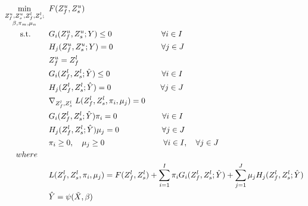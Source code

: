 \documentclass[12pt]{article}
\begin{document}
\vspace{-10mm}
\begin{subequations}
\begin{flalign}
\min\limits_{\substack{Z_f^u,Z_s^u,Z_f^l,Z_s^l; \\ \beta,\pi_m,\mu_n}} \hspace{2 mm} & F(Z_f^u,Z_s^u) \label{eq:eq8}\\
\textrm{s.t.} \hspace{8 mm} & G_i(Z_f^u,Z_s^u;Y)\leq 0 \hspace{22 mm} \forall i \in I\\
& H_j(Z_f^u,Z_s^u;Y)= 0 \hspace{21.5 mm} \forall j \in J\\
& Z_f^u=Z_f^l \hspace{39 mm} \label{eq:eq2-1}\\
& G_i(Z_f^l,Z_s^l;\hat{Y})\leq 0 \hspace{23 mm} \forall i \in I\\
& H_j(Z_f^l,Z_s^l;\hat{Y})= 0 \hspace{22 mm} \forall j \in J\\
& \nabla_{Z_f^l,Z_s^l} \hspace{1 mm} L(Z_f^l,Z_s^l,\pi_i,\mu_j)=0\\
& G_i(Z_f^l,Z_s^l;\hat{Y})\pi_i =0 \hspace{20 mm} \forall i \in I \label{eq:eq2-2}\\
& H_j(Z_f^l,Z_s^l;\hat{Y})\mu_j =0 \hspace{19 mm} \forall j \in J \label{eq:eq2-3}\\
& \pi_i \geq 0,\quad \mu_j \geq 0 \hspace{26.2 mm} \forall i \in I,\quad \forall j \in J \label{eq:eq9}\\
where \hspace{5 mm}& \nonumber \\
& L(Z_f^l,Z_s^l,\pi_i,\mu_j)=F(Z_f^l,Z_s^l)+\sum\limits_{i=1}^{I} \pi_i G_i(Z_f^l,Z_s^l;\hat{Y})+\sum\limits_{j=1}^{J} \mu_j H_j(Z_f^l,Z_s^l;\hat{Y}) \nonumber\\
& \hat{Y}=\psi(\Tilde{X},\beta) \nonumber
\end{flalign}
\end{subequations}
\newpage
\end{document}
